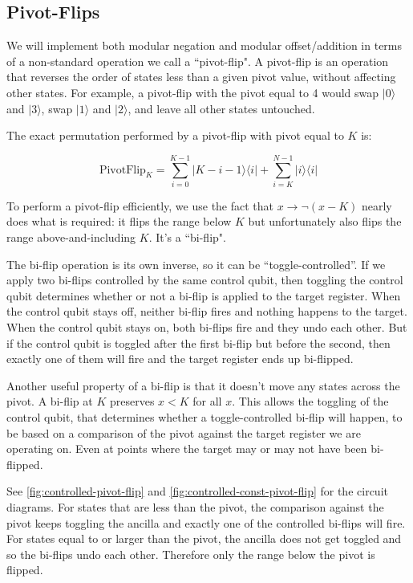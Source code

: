 \documentclass[twocolumn,longbibliography]{quantumarticle}
\begin{document}
\subsection{Pivot-Flips} \label{sec:pivot-flips}

We will implement both modular negation and modular offset/addition in terms of a non-standard operation we call a ``pivot-flip".
A pivot-flip is an operation that reverses the order of states less than a given pivot value, without affecting other states.
For example, a pivot-flip with the pivot equal to 4 would swap $|0\rangle$ and $|3\rangle$, swap $|1\rangle$ and $|2\rangle$, and leave all other states untouched.

The exact permutation performed by a pivot-flip with pivot equal to $K$ is:

$$\text{PivotFlip}_K = \sum_{i=0}^{K-1} |K-i-1\rangle \langle i| + \sum_{i=K}^{N-1} |i\rangle \langle i|$$

To perform a pivot-flip efficiently, we use the fact that $x \rightarrow \lnot(x - K)$ nearly does what is required: it flips the range below $K$ but unfortunately also flips the range above-and-including $K$.
It's a ``bi-flip".

The bi-flip operation is its own inverse, so it can be ``toggle-controlled''.
If we apply two bi-flips controlled by the same control qubit, then toggling the control qubit determines whether or not a bi-flip is applied to the target register.
When the control qubit stays off, neither bi-flip fires and nothing happens to the target.
When the control qubit stays on, both bi-flips fire and they undo each other.
But if the control qubit is toggled after the first bi-flip but before the second, then exactly one of them will fire and the target register ends up bi-flipped.

Another useful property of a bi-flip is that it doesn't move any states across the pivot.
A bi-flip at $K$ preserves $x<K$ for all $x$.
This allows the toggling of the control qubit, that determines whether a toggle-controlled bi-flip will happen, to be based on a comparison of the pivot against the target register we are operating on.
Even at points where the target may or may not have been bi-flipped.

See \autoref{fig:controlled-pivot-flip} and \autoref{fig:controlled-const-pivot-flip} for the circuit diagrams.
For states that are less than the pivot, the comparison against the pivot keeps toggling the ancilla and exactly one of the controlled bi-flips will fire.
For states equal to or larger than the pivot, the ancilla does not get toggled and so the bi-flips undo each other.
Therefore only the range below the pivot is flipped.
\end{document}
